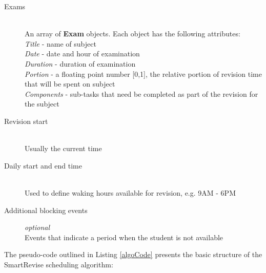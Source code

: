 \documentclass[bsc,frontabs,twoside,singlespacing,parskip]{infthesis}     %
\begin{document}
		\begin{description}
			\item[Exams] \hfill \\
				An array of \textbf{Exam} objects. Each object has the following attributes: \\
				\textit{Title} - name of subject\\
				\textit{Date} - date and hour of examination\\
				\textit{Duration} - duration of examination\\
				\textit{Portion} - a floating point number [0,1], the relative portion of revision time that will be spent on subject\\
				\textit{Components} - sub-tasks that need be completed as part of the revision for the subject
			\item[Revision start] \hfill \\
				Usually the current time
			\item[Daily start and end time] \hfill \\
				Used to define waking hours available for revision, e.g. 9AM - 6PM
			\item[Additional blocking events] \textit{optional} \hfill \\
				Events that indicate a period when the student is not available
		\end{description}

		The pseudo-code outlined in Listing \ref{algoCode} presents the basic structure of the SmartRevise scheduling algorithm:
\end{document}
